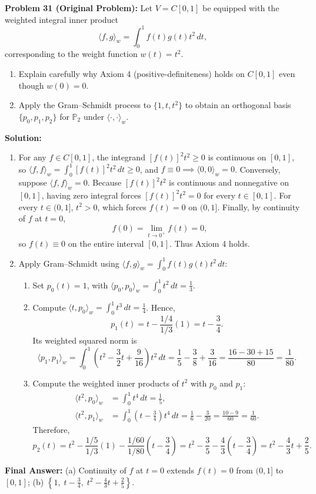 \documentclass[11pt, letterpaper]{article}
\theoremstyle{definition}
\theoremstyle{remark}
\begin{document}
\textbf{Problem 31 (Original Problem):} Let $V = C[0, 1]$ be equipped with the weighted integral inner product
\[
\langle f, g \rangle_w = \int_0^1 f(t)g(t)t^2\,dt,
\]
corresponding to the weight function $w(t) = t^2$.
\begin{enumerate}[label=(\alph*)]
    \item Explain carefully why Axiom 4 (positive-definiteness) holds on $C[0, 1]$ even though $w(0) = 0$.
    \item Apply the Gram--Schmidt process to $\{1, t, t^2\}$ to obtain an orthogonal basis $\{p_0, p_1, p_2\}$ for $\mathbb{P}_2$ under $\langle \cdot, \cdot \rangle_w$.
\end{enumerate}

\textbf{Solution:}
\begin{enumerate}[label=(\alph*)]
    \item For any $f \in C[0, 1]$, the integrand $[f(t)]^2 t^2 \ge 0$ is continuous on $[0, 1]$, so $\langle f, f \rangle_w = \int_0^1 [f(t)]^2 t^2\,dt \ge 0$, and $f \equiv 0 \implies \langle 0, 0 \rangle_w = 0$. Conversely, suppose $\langle f, f \rangle_w = 0$. Because $[f(t)]^2 t^2$ is continuous and nonnegative on $[0, 1]$, having zero integral forces $[f(t)]^2 t^2 = 0$ for every $t \in [0, 1]$. For every $t \in (0, 1]$, $t^2 > 0$, which forces $f(t) = 0$ on $(0, 1]$. Finally, by continuity of $f$ at $t = 0$,
    \[
    f(0) = \lim_{t \to 0^+} f(t) = 0,
    \]
    so $f(t) \equiv 0$ on the entire interval $[0, 1]$. Thus Axiom 4 holds.
    \item Apply Gram--Schmidt using $\langle f, g \rangle_w = \int_0^1 f(t)g(t)t^2\,dt$:
    \begin{enumerate}
        \item Set $p_0(t) = 1$, with $\langle p_0, p_0 \rangle_w = \int_0^1 t^2\,dt = \frac{1}{3}$.
        \item Compute $\langle t, p_0 \rangle_w = \int_0^1 t^3\,dt = \frac{1}{4}$. Hence,
        \[
        p_1(t) = t - \frac{1/4}{1/3}(1) = t - \frac{3}{4}.
        \]
        Its weighted squared norm is
        \[
        \langle p_1, p_1 \rangle_w = \int_0^1 \left(t^2 - \frac{3}{2}t + \frac{9}{16}\right)t^2\,dt = \frac{1}{5} - \frac{3}{8} + \frac{3}{16} = \frac{16 - 30 + 15}{80} = \frac{1}{80}.
        \]
        \item Compute the weighted inner products of $t^2$ with $p_0$ and $p_1$:
        \begin{align*}
        \langle t^2, p_0 \rangle_w &= \int_0^1 t^4\,dt = \frac{1}{5}, \\
        \langle t^2, p_1 \rangle_w &= \int_0^1 \left(t - \frac{3}{4}\right)t^4\,dt = \frac{1}{6} - \frac{3}{20} = \frac{10 - 9}{60} = \frac{1}{60}.
        \end{align*}
        Therefore,
        \[
        p_2(t) = t^2 - \frac{1/5}{1/3}(1) - \frac{1/60}{1/80}\left(t - \frac{3}{4}\right) = t^2 - \frac{3}{5} - \frac{4}{3}\left(t - \frac{3}{4}\right) = t^2 - \frac{4}{3}t + \frac{2}{5}.
        \]
    \end{enumerate}
\end{enumerate}
\textbf{Final Answer:} (a) Continuity of $f$ at $t = 0$ extends $f(t) = 0$ from $(0, 1]$ to $[0, 1]$; (b) $\left\{1,\; t - \frac{3}{4},\; t^2 - \frac{4}{3}t + \frac{2}{5}\right\}$.
\end{document}
